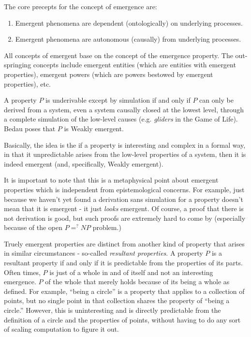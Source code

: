 \documentclass{article}
\newcommand{\ti}[1]{\textit{#1}}
\begin{document}
The core precepts for the concept of emergence are:
\begin{enumerate}
    \item Emergent phenomena are dependent (ontologically) on underlying processes.
    \item Emergent phenomena are autonomous (causally) from underlying processes.
\end{enumerate}

All concepts of emergent base on the concept of the emergence property. The out-springing concepts include emergent entities (which are entities with emergent properties), emergent powers (which are powers bestowed by emergent properties), etc.

A property $P$ is underivable except by simulation if and only if $P$ can only be derived from a system, even a system causally closed at the lowest level, through a complete simulation of the low-level causes (e.g. \ti{gliders} in the Game of Life). Bedau poses that $P$ is Weakly emergent.

Basically, the idea is the if a property is interesting and complex in a formal way, in that it unpredictable arises from the low-level properties of a system, then it is indeed emergent (and, specifically, Weakly emergent).

It is important to note that this is a metaphysical point about emergent properties which is independent from epistemological concerns. For example, just because we haven't yet found a derivation sans simulation for a property doesn't mean that it is emergent - it just \ti{looks} emergent. Of course, a proof that there is not derivation is good, but such proofs are extremely hard to come by (especially because of the open $P =^? NP$ problem.)

Truely emergent properties are distinct from another kind of property that arises in similar circumstances - so-called \ti{resultant properties}. A property $P$ is a resultant property if and only if it is predictable from the properties of its parts. Often times, $P$ is just of a whole in and of itself and not an interesting emergence. $P$ of the whole that merely holds because of its being a whole as defined. For example, ``being a circle'' is a property that applies to a collection of points, but no single point in that collection shares the property of ``being a circle.'' However, this is uninteresting and is directly predictable from the definition of a circle and the properties of points, without having to do any sort of scaling computation to figure it out.
\end{document}
